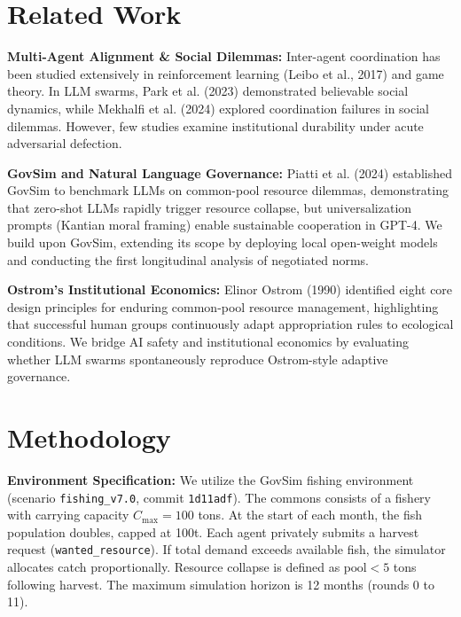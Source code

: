 ﻿\documentclass[11pt,a4paper]{article}
\begin{document}
\section{Related Work}
\textbf{Multi-Agent Alignment \& Social Dilemmas:} Inter-agent coordination has been studied extensively in reinforcement learning (Leibo et al., 2017) and game theory. In LLM swarms, Park et al. (2023) demonstrated believable social dynamics, while Mekhalfi et al. (2024) explored coordination failures in social dilemmas. However, few studies examine institutional durability under acute adversarial defection.

\textbf{GovSim and Natural Language Governance:} Piatti et al. (2024) established GovSim to benchmark LLMs on common-pool resource dilemmas, demonstrating that zero-shot LLMs rapidly trigger resource collapse, but universalization prompts (Kantian moral framing) enable sustainable cooperation in GPT-4. We build upon GovSim, extending its scope by deploying local open-weight models and conducting the first longitudinal analysis of negotiated norms.

\textbf{Ostrom's Institutional Economics:} Elinor Ostrom (1990) identified eight core design principles for enduring common-pool resource management, highlighting that successful human groups continuously adapt appropriation rules to ecological conditions. We bridge AI safety and institutional economics by evaluating whether LLM swarms spontaneously reproduce Ostrom-style adaptive governance.

\section{Methodology}
\textbf{Environment Specification:} We utilize the GovSim fishing environment (scenario \texttt{fishing\_v7.0}, commit \texttt{1d11adf}). The commons consists of a fishery with carrying capacity $C_{\max} = 100$ tons. At the start of each month, the fish population doubles, capped at 100t. Each agent privately submits a harvest request (\texttt{wanted\_resource}). If total demand exceeds available fish, the simulator allocates catch proportionally. Resource collapse is defined as $\text{pool} < 5$ tons following harvest. The maximum simulation horizon is 12 months (rounds 0 to 11).
\end{document}
